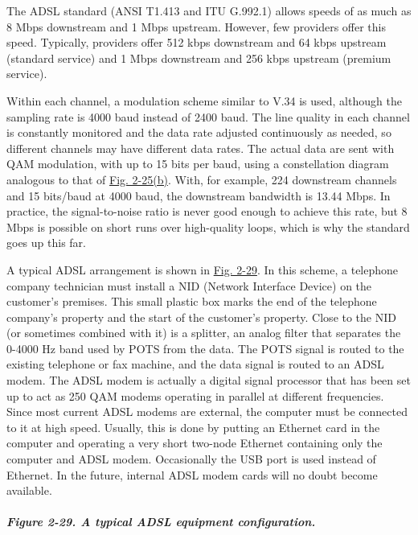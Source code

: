 \documentclass[b5paper,11pt]{memoir}
\begin{document}
The ADSL standard (ANSI T1.413 and ITU G.992.1) allows speeds of as much
as 8 Mbps downstream and 1 Mbps upstream. However, few providers offer
this speed. Typically, providers offer 512 kbps downstream and 64 kbps
upstream (standard service) and 1 Mbps downstream and 256 kbps upstream
(premium service).

Within each channel, a modulation scheme similar to V.34 is used,
although the sampling rate is 4000 baud instead of 2400 baud. The line
quality in each channel is constantly monitored and the data rate
adjusted continuously as needed, so different channels may have
different data rates. The actual data are sent with QAM modulation, with
up to 15 bits per baud, using a constellation diagram analogous to that
of
\protect\hyperlink{0130661023_ch02lev1sec5.htmlux5cux23ch02fig25}{Fig.
2-25(b)}. With, for example, 224 downstream channels and 15 bits/baud at
4000 baud, the downstream bandwidth is 13.44 Mbps. In practice, the
signal-to-noise ratio is never good enough to achieve this rate, but 8
Mbps is possible on short runs over high-quality loops, which is why the
standard goes up this far.

A typical ADSL arrangement is shown in
\protect\hyperlink{0130661023_ch02lev1sec5.htmlux5cux23ch02fig29}{Fig.
2-29}. In this scheme, a telephone company technician must install a
{NID} ({Network Interface Device}) on the customer's premises. This
small plastic box marks the end of the telephone company's property and
the start of the customer's property. Close to the NID (or sometimes
combined with it) is a {splitter}, an analog filter that separates the
0-4000 Hz band used by POTS from the data. The POTS signal is routed to
the existing telephone or fax machine, and the data signal is routed to
an ADSL modem. The ADSL modem is actually a digital signal processor
that has been set up to act as 250 QAM modems operating in parallel at
different frequencies. Since most current ADSL modems are external, the
computer must be connected to it at high speed. Usually, this is done by
putting an Ethernet card in the computer and operating a very short
two-node Ethernet containing only the computer and ADSL modem.
Occasionally the USB port is used instead of Ethernet. In the future,
internal ADSL modem cards will no doubt become available.

\subparagraph[Figure 2-29. A typical ADSL equipment
configuration.]{\texorpdfstring{\protect\hypertarget{0130661023_ch02lev1sec5.htmlux5cux23ch02fig29}{}{}Figure
2-29. A typical ADSL equipment
configuration.}{Figure 2-29. A typical ADSL equipment configuration.}}
\end{document}
